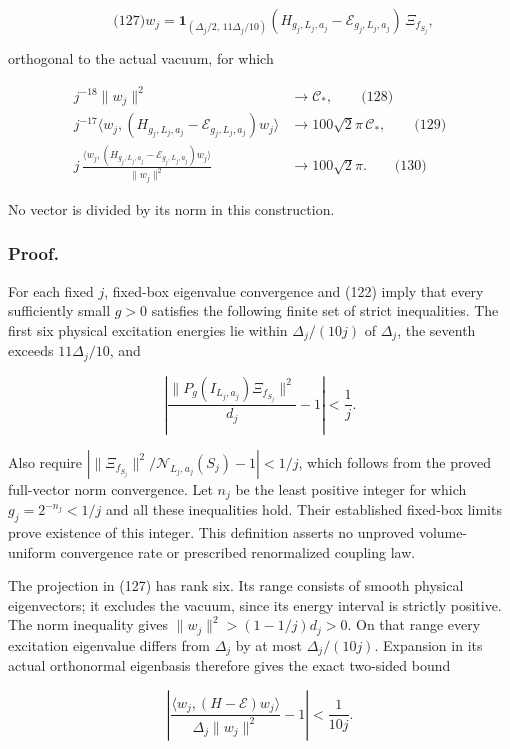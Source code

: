\[
\qquad\text{(127)}
 w_j=\mathbf1_{(\Delta_j/2,\,11\Delta_j/10)}
        (H_{g_j,L_j,a_j}-\mathcal E_{g_j,L_j,a_j})
        \,\Xi_{f_{S_j}},
\]

orthogonal to the actual vacuum, for which

\[
\begin{aligned}
 j^{-18}\|w_j\|^2&\longrightarrow\mathcal C_*,
 \qquad\text{(128)}\\
 j^{-17}\langle w_j,(H_{g_j,L_j,a_j}-\mathcal E_{g_j,L_j,a_j})w_j\rangle
 &\longrightarrow100\sqrt2\pi\,\mathcal C_*,
 \qquad\text{(129)}\\
 j\,\frac{\langle w_j,(H_{g_j,L_j,a_j}-\mathcal E_{g_j,L_j,a_j})w_j\rangle}
               {\|w_j\|^2}
 &\longrightarrow100\sqrt2\pi .
 \qquad\text{(130)}
\end{aligned}
\]

No vector is divided by its norm in this construction.

\subsubsection{Proof.}\label{fabel-low-mode-transfer-md-proof.-1}

For each fixed \(j\), fixed-box eigenvalue convergence and (122) imply
that every sufficiently small \(g>0\) satisfies the following finite set
of strict inequalities. The first six physical excitation energies lie
within \(\Delta_j/(10j)\) of \(\Delta_j\), the seventh exceeds
\(11\Delta_j/10\), and

\[
\left|\frac{\|P_g(I_{L_j,a_j})\Xi_{f_{S_j}}\|^2}{d_j}-1\right|<\frac1j.
\]

Also require \(|\|\Xi_{f_{S_j}}\|^2/\mathcal N_{L_j,a_j}(S_j)-1|<1/j\),
which follows from the proved full-vector norm convergence. Let \(n_j\)
be the least positive integer for which \(g_j=2^{-n_j}<1/j\) and all
these inequalities hold. Their established fixed-box limits prove
existence of this integer. This definition asserts no unproved
volume-uniform convergence rate or prescribed renormalized coupling law.

The projection in (127) has rank six. Its range consists of smooth
physical eigenvectors; it excludes the vacuum, since its energy interval
is strictly positive. The norm inequality gives
\(\|w_j\|^2>(1-1/j)d_j>0\). On that range every excitation eigenvalue
differs from \(\Delta_j\) by at most \(\Delta_j/(10j)\). Expansion in
its actual orthonormal eigenbasis therefore gives the exact two-sided
bound

\[
\left|
 \frac{\langle w_j,(H-\mathcal E)w_j\rangle}{\Delta_j\|w_j\|^2}-1
 \right|<\frac1{10j}.
\]

